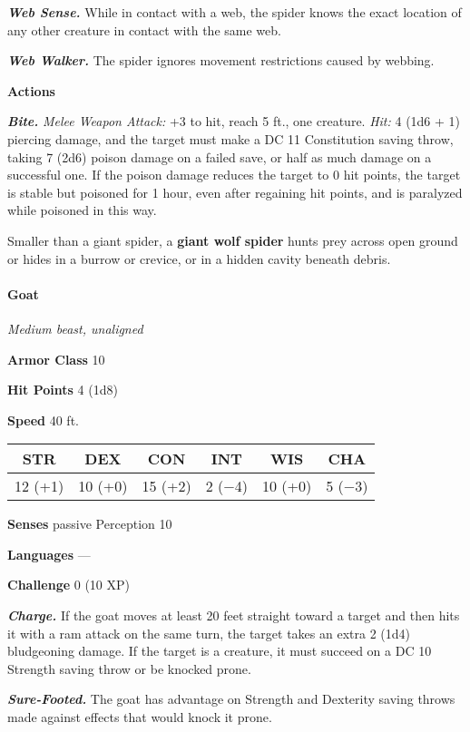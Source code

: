 \documentclass[
]{article}
\begin{document}
\emph{\textbf{Web Sense.}} While in contact with a web, the spider knows
the exact location of any other creature in contact with the same web.

\emph{\textbf{Web Walker.}} The spider ignores movement restrictions
caused by webbing.

\textbf{Actions}

\emph{\textbf{Bite.}} \emph{Melee Weapon Attack:} +3 to hit, reach 5
ft., one creature. \emph{Hit:} 4 (1d6 + 1) piercing damage, and the
target must make a DC 11 Constitution saving throw, taking 7 (2d6)
poison damage on a failed save, or half as much damage on a successful
one. If the poison damage reduces the target to 0 hit points, the target
is stable but poisoned for 1 hour, even after regaining hit points, and
is paralyzed while poisoned in this way.

Smaller than a giant spider, a \textbf{giant wolf spider} hunts prey
across open ground or hides in a burrow or crevice, or in a hidden
cavity beneath debris.

\hypertarget{goat}{%
\paragraph{Goat}\label{goat}}

\emph{Medium beast, unaligned}

\textbf{Armor Class} 10

\textbf{Hit Points} 4 (1d8)

\textbf{Speed} 40 ft.

\begin{longtable}[]{@{}cccccc@{}}
\toprule
STR & DEX & CON & INT & WIS & CHA\tabularnewline
\midrule
\endhead
12 (+1) & 10 (+0) & 15 (+2) & 2 (−4) & 10 (+0) & 5 (−3)\tabularnewline
\bottomrule
\end{longtable}

\textbf{Senses} passive Perception 10

\textbf{Languages} ---

\textbf{Challenge} 0 (10 XP)

\emph{\textbf{Charge.}} If the goat moves at least 20 feet straight
toward a target and then hits it with a ram attack on the same turn, the
target takes an extra 2 (1d4) bludgeoning damage. If the target is a
creature, it must succeed on a DC 10 Strength saving throw or be knocked
prone.

\emph{\textbf{Sure-Footed.}} The goat has advantage on Strength and
Dexterity saving throws made against effects that would knock it prone.
\end{document}
